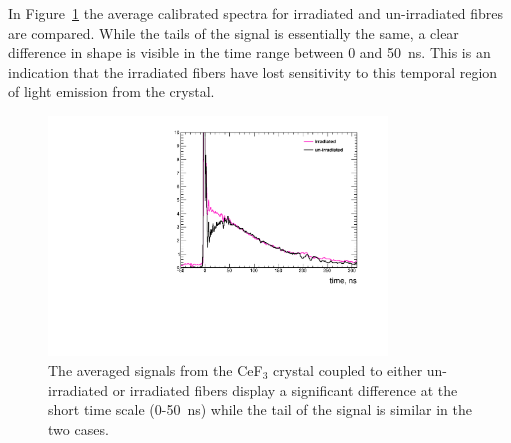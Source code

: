 \documentclass[a4paper,11pt]{article}
\begin{document}
In Figure~\ref{fig:CeF3shapeComparison} the average calibrated spectra for irradiated and un-irradiated fibres are compared. While the tails of the signal is essentially the same, a clear difference in shape is visible in the time range between 0 and 50~ns. This is an indication that the irradiated fibers have lost sensitivity to this temporal region of light emission from the crystal.
\begin{figure}[ht]
\begin{center}
        \includegraphics[width=9cm]{Figures/CeF3coupledFibresShapeComparison.pdf}
    \caption{\small The averaged signals from the CeF$_3$ crystal coupled to either un-irradiated or irradiated fibers display a significant difference at the short time scale (0-50~ns) while the tail of the signal is similar in the two cases.}
    \label{fig:CeF3shapeComparison}
\end{center}
\end{figure}
\end{document}
